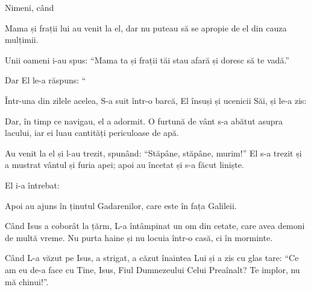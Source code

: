 {


\par }{\PP {}Nimeni, când
{}




\par }{\PP {}Mama și frații lui au venit la el, dar nu puteau să se apropie de el din cauza mulțimii.

Unii oameni i-au spus: “Mama ta și frații tăi stau afară și doresc să te vadă.”


\par }{\PP {}Dar El le-a răspuns: “{}


\par }{\PP {}Într-una din zilele acelea, S-a suit într-o barcă, El însuși și ucenicii Săi, și le-a zis:
{}

Dar, în timp ce navigau, el a adormit. O furtună de vânt s-a abătut asupra lacului, iar ei luau cantități periculoase de apă.

Au venit la el și l-au trezit, spunând: “Stăpâne, stăpâne, murim!” El s-a trezit și a mustrat vântul și furia apei; apoi au încetat și s-a făcut liniște.

El i-a întrebat:
{}


\par }{\PP {}Apoi au ajuns în ținutul Gadarenilor, care este în fața Galileii.

Când Isus a coborât la țărm, L-a întâmpinat un om din cetate, care avea demoni de multă vreme. Nu purta haine și nu locuia într-o casă, ci în morminte.

Când L-a văzut pe Isus, a strigat, a căzut înaintea Lui și a zis cu glas tare: “Ce am eu de-a face cu Tine, Isus, Fiul Dumnezeului Celui Preaînalt? Te implor, nu mă chinui!”.

}

